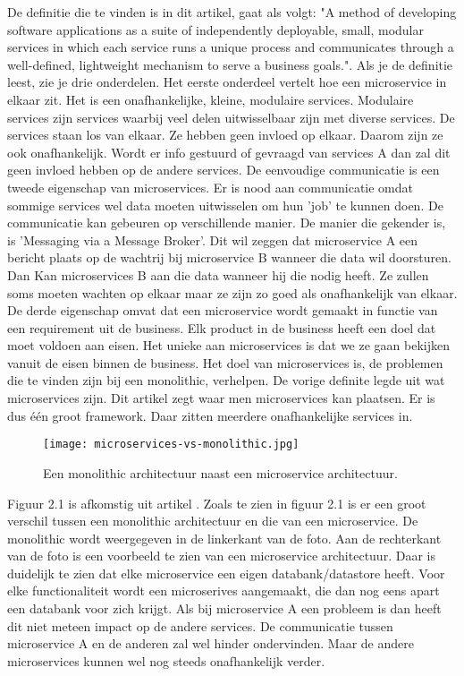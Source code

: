 De definitie die te vinden is in dit artikel, gaat als volgt: "A method of developing software applications as a suite of independently deployable, small, modular services in which each service runs a unique process and communicates through a well-defined, lightweight mechanism to serve a business goals.". Als je de definitie leest, zie je drie onderdelen. Het eerste onderdeel vertelt hoe een microservice in elkaar zit. Het is een onafhankelijke, kleine, modulaire services. Modulaire services zijn services waarbij veel delen uitwisselbaar zijn met diverse services. De services staan los van elkaar. Ze hebben geen invloed op elkaar. Daarom zijn ze ook onafhankelijk. Wordt er info gestuurd of gevraagd van services A dan zal dit geen invloed hebben op de andere services. De eenvoudige communicatie is een tweede eigenschap van microservices. Er is nood aan communicatie omdat sommige services wel data moeten uitwisselen om hun 'job' te kunnen doen. De communicatie kan gebeuren op verschillende manier. De manier die gekender is, is 'Messaging via a Message Broker'. Dit wil zeggen dat microservice A een bericht plaats op de wachtrij bij microservice B wanneer die data wil doorsturen. Dan Kan microservices B aan die data wanneer hij die nodig heeft. Ze zullen soms moeten wachten op elkaar maar ze zijn zo goed als onafhankelijk van elkaar. De derde eigenschap omvat dat een microservice wordt gemaakt in functie van een requirement uit de business. Elk product in de business heeft een doel dat moet voldoen aan eisen. Het unieke aan microservices is dat we ze gaan bekijken vanuit de eisen binnen de business. Het doel van microservices is, de problemen die te vinden zijn bij een monolithic, verhelpen. De vorige definite legde uit wat microservices zijn. Dit artikel zegt waar men microservices kan plaatsen. Er is dus één groot framework. Daar zitten meerdere onafhankelijke services in.
\begin{figure}[h]
	\texttt{[image: microservices-vs-monolithic.jpg]}
	\centering
	\caption{Een monolithic architectuur naast een microservice architectuur. \textcite{Watts2018}}
\end{figure}
Figuur 2.1 is afkomstig uit artikel \textcite{Watts2018}.
Zoals te zien in figuur 2.1 is er een groot verschil tussen een monolithic architectuur en die van een microservice. De monolithic wordt weergegeven in de linkerkant van de foto. Aan de rechterkant van de foto is een voorbeeld te zien van een microservice architectuur. Daar is duidelijk te zien dat elke microservice een eigen databank/datastore heeft. Voor elke functionaliteit wordt een microserives aangemaakt, die dan nog eens apart een databank voor zich krijgt. Als bij microservice A een probleem is dan heeft dit niet meteen impact op de andere services. De communicatie tussen microservice A en de anderen zal wel hinder ondervinden. Maar de andere microservices kunnen wel nog steeds onafhankelijk verder. 
